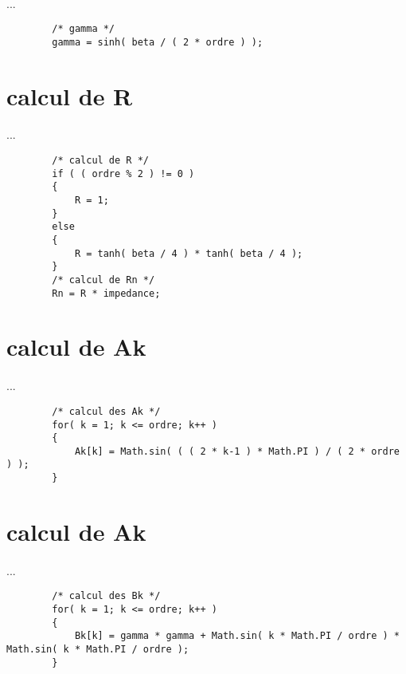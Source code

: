 \documentclass[a4paper,11pt]{article}
\begin{document}
    \paragraph{}
    ...
    \begin{lstlisting}
        /* gamma */
        gamma = sinh( beta / ( 2 * ordre ) );
    \end{lstlisting}

\section{calcul de R}
    \paragraph{}
    ...
    \begin{lstlisting}
        /* calcul de R */
        if ( ( ordre % 2 ) != 0 )
        {
            R = 1;
        }
        else
        {
            R = tanh( beta / 4 ) * tanh( beta / 4 );
        }
        /* calcul de Rn */
        Rn = R * impedance;
    \end{lstlisting}

\section{calcul de Ak }
    \paragraph{}
    ...
    \begin{lstlisting}
        /* calcul des Ak */
        for( k = 1; k <= ordre; k++ )
        {
            Ak[k] = Math.sin( ( ( 2 * k-1 ) * Math.PI ) / ( 2 * ordre ) );
        }
    \end{lstlisting}

\section{calcul de Ak }
    \paragraph{}
    ...
    \begin{lstlisting}
        /* calcul des Bk */
        for( k = 1; k <= ordre; k++ )
        {
            Bk[k] = gamma * gamma + Math.sin( k * Math.PI / ordre ) * Math.sin( k * Math.PI / ordre );
        }
    \end{lstlisting}
\end{document}
